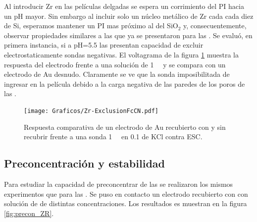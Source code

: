 	 	 Al introducir Zr en las películas delgadas se espera un corrimiento del PI hacia un pH mayor\cite{Kosmulski2014}. Sin embargo al incluir solo un núcleo metálico de Zr cada cada diez de Si, esperamos mantener un PI mas próximo al del SiO$_2$ y, consecuentemente, observar propiedades similares a las que ya se presentaron para las \pdmF.
	 	 Se evaluó, en primera instancia, si a pH=5.5 las \pdmZ\space presentan capacidad de excluir electrostaticamente sondas negativas. El voltagrama de la figura \ref{fig:fcn-zr} muestra la respuesta del electrodo frente a una solución de \fe\space \SI{1}{\milli\Molar} y se compara con un electrodo de Au desnudo. Claramente se ve que la sonda imposibilitada de ingresar en la película debido a la carga negativa de las paredes de los poros de las \pdmZ. 
				
				\begin{figure}[ht]
				\centering
		 	    \texttt{[image: Graficos/Zr-ExclusionFcCN.pdf]}
		        \caption[Exclusión electrostática en \pdmZ]{Respuesta comparativa de un electrodo de Au recubierto con \pdmZ\space y sin recubrir frente a una sonda \ferroferri\space \SI{1}{\milli\Molar} en \SI{0.1}{\Molar} de KCl contra ESC.}
		        \label{fig:fcn-zr}
		      	\end{figure} 
	
	 \subsection{Preconcentración y estabilidad}

		 	Para estudiar la capacidad de preconcentrar de las \pdmZ\space se realizaron los mismos experimentos que para las \pdmF. Se puso en contacto un electrodo recubierto con \pdmZ\space con solución de \ru\space de distintas concentraciones. Los resultados es muestran en la figura \ref{fig:precon_ZR}.

